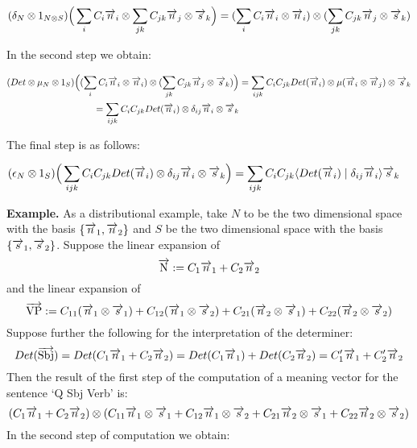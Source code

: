 \documentclass[a4paper,11pt]{easychair}
\begin{document}
\begin{align*}
(\delta_N \otimes 1_{N \otimes S})\Big(\sum_i C_i \overrightarrow{n}_i \otimes \sum_{jk} C_{jk} \overrightarrow{n}_j \otimes \overrightarrow{s}_k\Big) = 
(\sum_i C_i \overrightarrow{n}_i \otimes \overrightarrow{n}_i) \otimes  (\sum_{jk} C_{jk} \overrightarrow{n}_j \otimes \overrightarrow{s}_k)
\end{align*}

\noindent
In the second step we obtain: 

\begin{align*}
(Det \otimes  \mu_N \otimes 1_S)\Big((\sum_i C_i \overrightarrow{n}_i \otimes \overrightarrow{n}_i) \otimes  (\sum_{jk} C_{jk} \overrightarrow{n}_j \otimes \overrightarrow{s}_k)\Big) &= 
\sum_{ijk} C_i C_{jk} Det(\overrightarrow{n}_i) \otimes \mu(\overrightarrow{n}_i \otimes \overrightarrow{n}_j) \otimes \overrightarrow{s}_k \\
= \sum_{ijk} C_i C_{jk} Det(\overrightarrow{n}_i) \otimes \delta_{ij} \overrightarrow{n}_i \otimes \overrightarrow{s}_k&
\end{align*}

\noindent
The final step is as follows:

\begin{align*}
(\epsilon_{N} \otimes 1_S)  \Big(\sum_{ijk} C_i C_{jk} Det(\overrightarrow{n}_i) \otimes \delta_{ij} \overrightarrow{n}_i \otimes \overrightarrow{s}_k \Big) &=   
\sum_{ijk} C_i C_{jk} \langle Det(\overrightarrow{n}_i) \mid \delta_{ij} \overrightarrow{n}_i \rangle \overrightarrow{s}_k
\end{align*}

\noindent
{\bf Example.} 
As a distributional example, take $N$ to be the two dimensional space with the basis $\{\overrightarrow{n}_1, \overrightarrow{n}_2\}$ and $S$ be the two dimensional space with the basis $\{\overrightarrow{s}_1, \overrightarrow{s}_2\}$.  Suppose the linear expansion of 
\[
\overrightarrow{\text{N}} := C_1 \overrightarrow{n}_1 + C_2 \overrightarrow{n}_2
\]
 and the linear expansion of 
 \[
 \overrightarrow{\text{VP}} := C_{11} (\overrightarrow{n}_1 \otimes \overrightarrow{s}_1) + C_{12} (\overrightarrow{n}_1 \otimes \overrightarrow{s}_2) +  C_{21} ( \overrightarrow{n}_2 \otimes \overrightarrow{s}_1) + C_{22} (\overrightarrow{n}_2 \otimes \overrightarrow{s}_2)
 \]
    Suppose further the following for the interpretation of the determiner:
 \begin{equation}\label{eqDetLin}
Det(\overrightarrow{\text{Sbj}}) = Det(C_1 \overrightarrow{n}_1 + C_2 \overrightarrow{n}_2) =  Det(C_1 \overrightarrow{n}_1) + Det(C_2 \overrightarrow{n}_2) =  C'_1 \overrightarrow{n}_1 + C'_2 \overrightarrow{n}_2
\end{equation}
Then the result of the first step of the computation of a meaning vector for the sentence `Q Sbj Verb' is:
\[
(C_1\overrightarrow{n}_1 + C_2 \overrightarrow{n}_2) \otimes (C_{11} \overrightarrow{n}_1 \otimes \overrightarrow{s}_1 + C_{12} \overrightarrow{n}_1 \otimes \overrightarrow{s}_2
+ C_{21} \overrightarrow{n}_2 \otimes \overrightarrow{s}_1 + C_{22} \overrightarrow{n}_2 \otimes \overrightarrow{s}_2)
\]
In the second step of computation we obtain:
\end{document}
